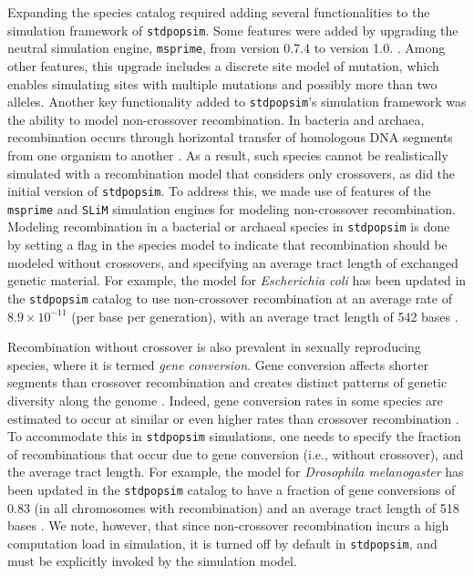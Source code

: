 \documentclass[hidelinks]{article}
\newcommand{\stdpopsim}{\texttt{stdpopsim}\xspace}
\begin{document}
Expanding the species catalog required adding several functionalities to the simulation framework of \stdpopsim.
Some features were added by upgrading the neutral simulation engine, \texttt{msprime}, from version 0.7.4 to version 1.0. \citep{Baumdicker2022}.
Among other features, this upgrade includes a discrete site model of mutation,
which enables simulating sites with multiple mutations and possibly more than two alleles.
Another key functionality added to \stdpopsim's simulation framework was the ability to model non-crossover recombination.
In bacteria and archaea, recombination occurs through horizontal transfer of homologous DNA segments from one organism to another \citep{Thomas2005,Didelot2010,Gophna2022}.
As a result, such species cannot be realistically simulated with a recombination model that considers only crossovers,
as did the initial version of \stdpopsim.
To address this, we made use of features of the \texttt{msprime} and \texttt{SLiM} simulation engines for modeling non-crossover recombination.
Modeling recombination in a bacterial or archaeal species in \stdpopsim is done by setting a flag in the species model to indicate that recombination should be modeled without crossovers,
and specifying an average tract length of exchanged genetic material.
For example, the model for \textit{Escherichia coli} has been updated in the \stdpopsim catalog to use non-crossover recombination at an average rate of $8.9\times 10^{-11}$ (per base per generation),
with an average tract length of 542 bases \citep{Wielgoss2011,Didelot2012}.

Recombination without crossover is also prevalent in sexually reproducing species,
where it is termed \emph{gene conversion}.
Gene conversion affects shorter segments than crossover recombination and creates distinct patterns of genetic diversity along the genome \citep{Korunes2017}.
Indeed, gene conversion rates in some species are estimated to occur at similar or even higher rates than crossover recombination \citep{Gay2007,Comeron2012,Wijnker2013}.
To accommodate this in \stdpopsim simulations,
one needs to specify the fraction of recombinations that occur due to gene conversion (i.e., without crossover), and the average tract length.
For example, the model for \emph{Drosophila melanogaster} has been updated in the \stdpopsim catalog to have a fraction of gene conversions of 0.83 (in all chromosomes with recombination) and an average tract length of 518 bases \citep{Comeron2012}.
We note, however, that since non-crossover recombination incurs a high computation load in simulation,
it is turned off by default in \stdpopsim, and must be explicitly invoked by the simulation model.
\end{document}
